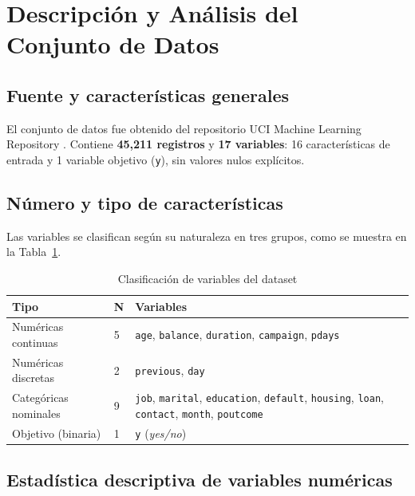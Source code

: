 \documentclass[conference]{IEEEtran}
\begin{document}
\section{Descripción y Análisis del Conjunto de Datos}
\label{sec:datos}

\subsection{Fuente y características generales}

El conjunto de datos fue obtenido del repositorio UCI Machine Learning Repository \cite{uci_bank}. Contiene \textbf{45{,}211 registros} y \textbf{17 variables}: 16 características de entrada y 1 variable objetivo (\texttt{y}), sin valores nulos explícitos.

\subsection{Número y tipo de características}

Las variables se clasifican según su naturaleza en tres grupos, como se muestra en la Tabla~\ref{tab:variables}.

\begin{table}[H]
\caption{Clasificación de variables del dataset}
\label{tab:variables}
\centering
\begin{tabular}{@{}llp{3.6cm}@{}}
\toprule
\textbf{Tipo} & \textbf{N} & \textbf{Variables} \\
\midrule
Numéricas continuas   & 5 & \texttt{age}, \texttt{balance}, \texttt{duration}, \texttt{campaign}, \texttt{pdays} \\
Numéricas discretas   & 2 & \texttt{previous}, \texttt{day} \\
Categóricas nominales & 9 & \texttt{job}, \texttt{marital}, \texttt{education}, \texttt{default}, \texttt{housing}, \texttt{loan}, \texttt{contact}, \texttt{month}, \texttt{poutcome} \\
Objetivo (binaria)    & 1 & \texttt{y} (\textit{yes/no}) \\
\bottomrule
\end{tabular}
\end{table}

\subsection{Estadística descriptiva de variables numéricas}
\end{document}
